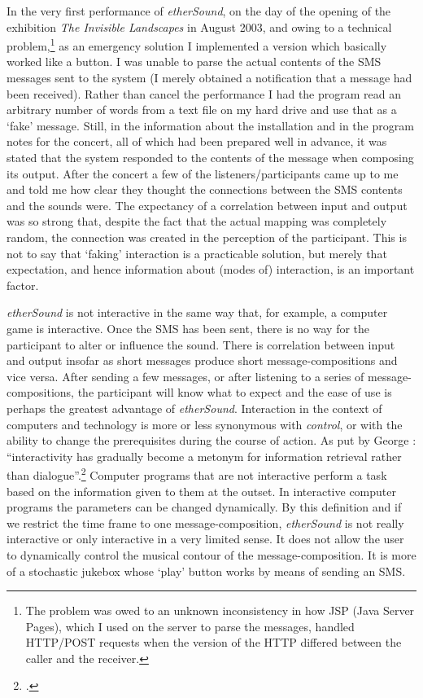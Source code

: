 In the very first performance of \emph{etherSound}, on the day of the opening of the exhibition \emph{The Invisible Landscapes} in August 2003, and owing to a technical problem,\footnote{The problem was owed to an unknown inconsistency in how JSP (Java Server Pages), which I used on the server to parse the messages, handled HTTP/POST requests when the version of the HTTP differed between the caller and the receiver.} as an emergency solution I implemented a version which basically worked like a button. I was unable to parse the actual contents of the SMS messages sent to the system (I merely obtained a notification that a message had been received). Rather than cancel the performance I had the program read an arbitrary number of words from a text file on my hard drive and use that as a `fake' message. Still, in the information about the installation and in the program notes for the concert, all of which had been prepared well in advance, it was stated that the system responded to the contents of the message when composing its output. After the concert a few of the listeners/participants came up to me and told me how clear they thought the connections between the SMS contents and the sounds were. The expectancy of a correlation between input and output was so strong that, despite the fact that the actual mapping was completely random, the connection was created in the perception of the participant. This is not to say that `faking' interaction is a practicable solution, but merely that expectation, and hence information about (modes of) interaction, is an important factor. 

\emph{etherSound} is not interactive in the same way that, for example, a computer game is interactive. Once the SMS has been sent, there is no way for the participant to alter or influence the sound. There is correlation between input and output insofar as short messages produce short message-compositions and vice versa. After sending a few messages, or after listening to a series of message-compositions, the participant will know what to expect and the ease of use is perhaps the greatest advantage of \emph{etherSound}. Interaction in the context of computers and technology is more or less synonymous with \textit{control}, or with the ability to change the prerequisites during the course of action. As put by George \citeauthor{lewis00}: ``interactivity has gradually become a metonym for information retrieval rather than dialogue''.\footcite[36]{lewis00}
Computer programs that are not interactive perform a task based on the information given to them at the outset. In interactive computer programs the parameters can be changed dynamically. By this definition and if we restrict the time frame to one message-composition, \emph{etherSound} is not really interactive or only interactive in a very limited sense. It does not allow the user to dynamically control the musical contour of the message-composition. It is more of a stochastic jukebox whose `play' button works by means of sending an SMS. 

